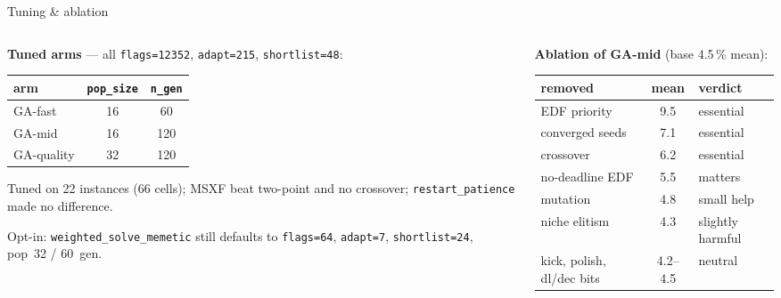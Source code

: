 \documentclass[aspectratio=169,t]{beamer}
\newcommand{\code}[1]{\texttt{#1}}
\begin{document}
\begin{frame}{Tuning \& ablation}
  \begin{columns}[T,onlytextwidth]
    \begin{column}{0.46\textwidth}
      \small
      \textbf{Tuned arms} --- all \code{flags=12352}, \code{adapt=215},
      \code{shortlist=48}:
      \begin{center}
      \footnotesize
      \begin{tabular}{lcc}
        \toprule
        arm & \code{pop\_size} & \code{n\_gen} \\
        \midrule
        GA-fast    & 16 & 60 \\
        GA-mid     & 16 & 120 \\
        GA-quality & 32 & 120 \\
        \bottomrule
      \end{tabular}
      \end{center}
      \scriptsize Tuned on 22 instances (66 cells); MSXF beat two-point and no
      crossover; \code{restart\_patience} made no difference.

      \vspace{1mm}
      \alert{Opt-in:} \code{weighted\_solve\_memetic} still defaults to
      \code{flags=64}, \code{adapt=7}, \code{shortlist=24}, pop~32 / 60~gen.
    \end{column}
    \begin{column}{0.52\textwidth}
      \small
      \textbf{Ablation of GA-mid} (base 4.5\,\% mean):
      \begin{center}
      \footnotesize
      \begin{tabular}{lcl}
        \toprule
        removed & mean & verdict \\
        \midrule
        EDF priority          & 9.5 & essential \\
        converged seeds       & 7.1 & essential \\
        crossover             & 6.2 & essential \\
        no-deadline EDF       & 5.5 & matters \\
        mutation              & 4.8 & small help \\
        niche elitism         & 4.3 & slightly harmful \\
        kick, polish, dl/dec bits & 4.2--4.5 & neutral \\
        \bottomrule
      \end{tabular}
      \end{center}
    \end{column}
  \end{columns}
\end{frame}
\end{document}
